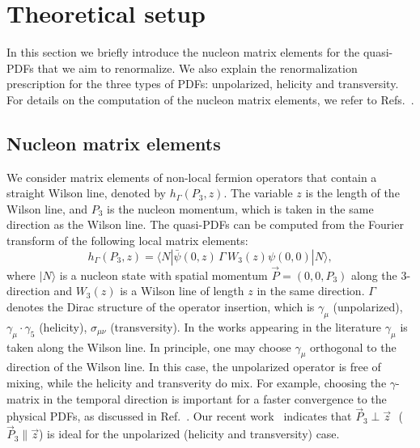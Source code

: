 \documentclass[12pt,tighten,nofootinbib,amssymb,floatfix]{article}
\begin{document}
\section{Theoretical setup}

In this section we briefly introduce the nucleon matrix elements for the quasi-PDFs that we aim to renormalize. 
We also explain the renormalization prescription for the three types of PDFs: unpolarized, helicity and transversity.
For details on the computation of the nucleon matrix elements, we refer to Refs.~\cite{Alexandrou:2015rja,Alexandrou:2016jqi}.

\vspace*{0.25cm}
\subsection{Nucleon matrix elements}
\vspace*{0.15cm}

We consider matrix elements of non-local fermion operators that contain a straight Wilson line, denoted by
$h_\Gamma(P_3,z)$. The variable $z$ is the length of the Wilson line, and $P_3$ is the nucleon momentum, 
which is taken in the same direction as the Wilson line.  
The quasi-PDFs can be computed from the Fourier transform of the following local matrix elements:
\begin{equation}
\label{MElements}
h_\Gamma(P_3,z)=\langle N |\bar{\psi}(0,z)\,\Gamma \,W_3(z) \psi(0,0) |N\rangle,
\end{equation}
where $|N\rangle$ is a nucleon state with spatial momentum $\vec{P}{=}(0,0,P_3)$ along the $3$-direction and 
$W_3(z)$ is a Wilson line of length $z$ in the same direction. $\Gamma$ denotes the Dirac structure of the
operator insertion, which is $\gamma_\mu$ (unpolarized), $\gamma_\mu\cdot\gamma_5$ (helicity), $\sigma_{\mu \nu}$ 
(transversity). In the works appearing in the literature $\gamma_\mu$ is taken along the Wilson line. In principle, one may 
choose $\gamma_\mu$ orthogonal to the direction of the Wilson line.  In this case, the unpolarized operator is 
free of mixing, while the helicity and transverity do mix. For example, choosing the $\gamma$-matrix in the temporal direction 
is important for a faster convergence to the physical PDFs, as discussed in Ref.~\cite{Radyushkin:2016hsy}. Our recent 
work~\cite{Constantinou:2017sej} indicates that $\vec P_3 {\perp} \vec z$ \,\,($\vec P_3 {\parallel} \vec z$) is ideal for 
the unpolarized (helicity and transversity) case.
\end{document}
